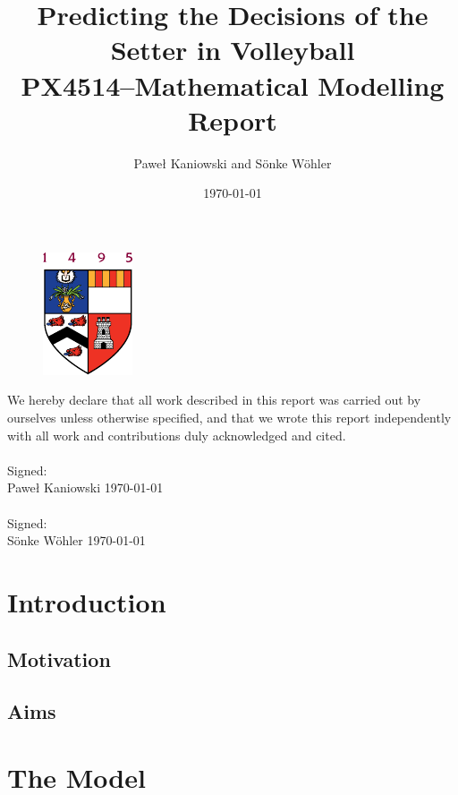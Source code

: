 \documentclass[11pt]{article}
\title{   Predicting the Decisions of the Setter in Volleyball \\
  \large PX4514--Mathematical Modelling Report
}
\author{Pawe{\l} Kaniowski and S\"onke W\"ohler}
\date{\today}
\begin{document}
  \maketitle
  \thispagestyle{empty}
  
  \begin{figure}[h!]
    \centering
    \includegraphics{otherImages/abdnshield}
    \caption*{}
  \end{figure}

  \vfill
  We hereby declare that all work described in this report was carried out by ourselves unless otherwise specified, and that we wrote this report independently with all work and contributions duly acknowledged and cited.
  \\\\
  Signed:
  \\
  Pawe{\l} Kaniowski \hfil \today
  \\\\
  Signed: 
  \\
  S\"onke W\"ohler \hfil \today  
  \clearpage
  
  \abstract
    \begingroup
      \fontsize{8pt}{10pt}\selectfont
    
        \lipsum[1]
    
    \endgroup
    \hrulefill
    
    \section{Introduction}
      \subsection{Motivation}
      \subsection{Aims}
    \section{The Model}
\end{document}
